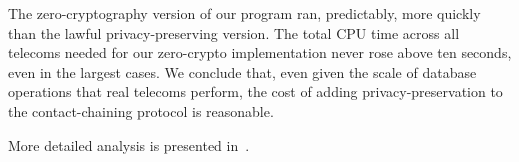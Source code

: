 
The zero-cryptography version of our program ran, predictably, more quickly than the lawful privacy-preserving version. The total CPU time across all telecoms needed for our zero-crypto implementation never rose above ten seconds, even in the largest cases. 
We conclude that, even given the scale of database operations that real 
telecoms perform, the cost of adding privacy-preservation to the contact-chaining protocol is reasonable.

More detailed analysis is presented in~\cite[Section 4.3]{sff-TR}.
